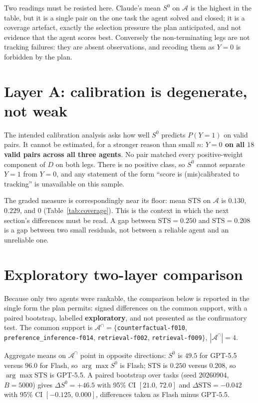 \documentclass{article}
\newcommand{\task}[1]{\texttt{#1}}
\newcommand{\A}{\mathcal{A}}
\newcommand{\Acap}{\mathcal{A}^{\cap}}
\newcommand{\STS}{\mathrm{STS}}
\begin{document}
Two readings must be resisted here.
Claude's mean $S^{0}$ on $\A$ is the highest in the table, but it is a single pair on the one task the agent solved and closed; it is a coverage artefact, exactly the selection pressure the plan anticipated, and not evidence that the agent scores best.
Conversely the non-terminating legs are not tracking failures: they are absent observations, and recoding them as $Y=0$ is forbidden by the plan.

\section{Layer A: calibration is degenerate, not weak}
\label{sec:layera}

The intended calibration analysis asks how well $S^{0}$ predicts $P(Y=1)$ on valid pairs.
It cannot be estimated, for a stronger reason than small $n$: \textbf{$Y=0$ on all $18$ valid pairs across all three agents}.
No pair matched every positive-weight component of $D$ on both legs.
There is no positive class, so $S^{0}$ cannot separate $Y=1$ from $Y=0$, and any statement of the form ``score is (mis)calibrated to tracking'' is unavailable on this sample.

The graded measure is correspondingly near its floor: mean $\STS$ on $\A$ is $0.130$, $0.229$, and $0$ (Table~\ref{tab:coverage}).
This is the context in which the next section's differences must be read.
A gap between $\STS=0.250$ and $\STS=0.208$ is a gap between two small residuals, not between a reliable agent and an unreliable one.

\section{Exploratory two-layer comparison}
\label{sec:selection}

Because only two agents were rankable, the comparison below is reported in the single form the plan permits: signed differences on the common support, with a paired bootstrap, labelled \textbf{exploratory}, and not presented as the confirmatory test.
The common support is $\Acap=\{$\task{counterfactual-f010}, \task{preference\_inference-f014}, \task{retrieval-f002}, \task{retrieval-f009}$\}$, $|\Acap|=4$.

Aggregate means on $\Acap$ point in opposite directions: $S^{0}$ is $49.5$ for GPT-5.5 versus $96.0$ for Flash, so $\arg\max S^{0}$ is Flash; $\STS$ is $0.250$ versus $0.208$, so $\arg\max\STS$ is GPT-5.5.
A paired bootstrap over tasks (seed $20260904$, $B=5000$) gives $\Delta S^{0}=+46.5$ with 95\% CI $[21.0,\,72.0]$ and $\Delta\STS=-0.042$ with 95\% CI $[-0.125,\,0.000]$, differences taken as Flash minus GPT-5.5.
\end{document}

